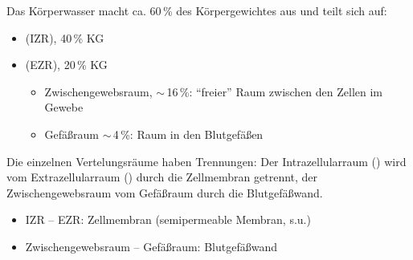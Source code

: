 {

Das Körperwasser macht ca. 60\,\% des Körpergewichtes
aus und teilt sich auf:

\begin{itemize}
  \item {} (IZR), 40\,\% KG
  \item {} (EZR), 20\,\% KG
  \begin{itemize}
    \item {}Zwischengewebsraum,
    $\sim$\,16\,\%: "`freier"'
    Raum zwischen den Zellen im Gewebe
    \item {}Gefäßraum $\sim$\,4\,\%:
    Raum in den Blutgefäßen
  \end{itemize}
\end{itemize}
}{}{}{}{}


{
Die einzelnen Vertelungsräume haben Trennungen: Der Intrazellularraum
() wird vom Extrazellularraum () durch die Zellmembran
getrennt, der Zwischengewebsraum vom Gefäßraum durch die Blutgefäßwand.
}{
\begin{itemize}
    \item IZR -- EZR:    Zellmembran (semipermeable Membran, s.u.)
    \item Zwischengewebsraum -- Gefäßraum:  Blutgefäßwand
\end{itemize}
}{}{}{}


